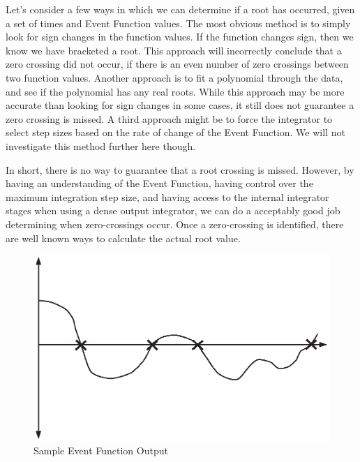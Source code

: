 Let's consider a few ways in which we can determine if a root has
occurred, given a set of times and Event Function values.  The most
obvious method is to simply look for sign changes in the function
values. If the function changes sign, then we know we have bracketed
a root. This approach will incorrectly conclude that a zero crossing
did not occur, if there is an even number of zero crossings between
two function values.  Another approach is to fit a polynomial
through the data, and see if the polynomial has any real roots.
While this approach may be more accurate than looking for sign
changes in some cases, it still does not guarantee a zero crossing
is missed. A third approach might be to force the integrator to
select step sizes based on the rate of change of the Event Function.
We will not investigate this method further here though.

In short, there is no way to guarantee that a root crossing is
missed.  However, by having an understanding of the Event Function,
having control over the maximum integration step size, and having
access to the internal integrator stages when using a dense output
integrator, we can do a acceptably good job determining when
zero-crossings occur.  Once a zero-crossing is identified, there are
well known ways to calculate the actual root value.




\begin{figure}[htb]
    \centering
        \includegraphics[scale=1.0]{Images/EventsFunction.eps}
    \caption{ Sample Event Function Output }
    \label{fig:SampleEventFunction}
\end{figure}

